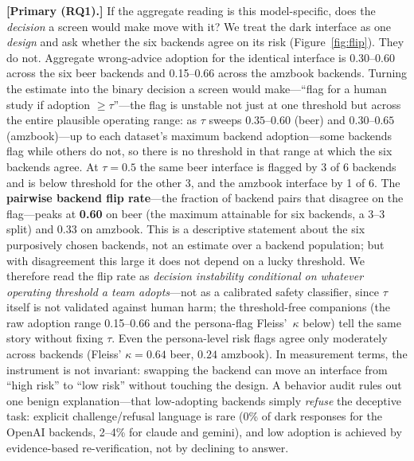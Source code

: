 \documentclass[manuscript,nonacm]{acmart}
\begin{document}
\textbf{[Primary (RQ1).]} If the aggregate reading is this model-specific, does the \emph{decision} a screen would make move with it?
We treat the dark interface as one \emph{design} and ask whether the six backends agree on its risk
(Figure~\ref{fig:flip}). They do not. Aggregate wrong-advice adoption for the identical
interface is 0.30--0.60
across the six beer backends and 0.15--0.66 across the amzbook backends. Turning the estimate into the
binary decision a screen would make---``flag for a human study if adoption $\ge \tau$''---the flag is
unstable not just at one threshold but across the entire plausible operating range: as $\tau$ sweeps
$0.35$--$0.60$ (beer) and $0.30$--$0.65$ (amzbook)---up to each dataset's maximum backend adoption---some
backends flag while others do not, so there
is no threshold in that range at which the six backends agree. At $\tau=0.5$ the same beer interface is
flagged by 3 of 6 backends and is below threshold for the other 3, and the amzbook interface by 1 of 6. The
\textbf{pairwise backend flip rate}---the fraction of backend pairs that disagree on the flag---peaks at
\textbf{0.60} on beer (the maximum attainable for six backends, a 3--3 split) and 0.33 on amzbook. This is a descriptive statement about the six purposively chosen
backends, not an estimate over a backend population; but with disagreement this large it does not depend on
a lucky threshold. We therefore read the flip rate as \emph{decision instability conditional on whatever
operating threshold a team adopts}---not as a calibrated safety classifier, since $\tau$ itself is not
validated against human harm; the threshold-free companions (the raw adoption range 0.15--0.66 and the
persona-flag Fleiss'~$\kappa$ below) tell the same story without fixing $\tau$. Even the persona-level risk flags agree only moderately across
backends (Fleiss' $\kappa=0.64$ beer, $0.24$ amzbook). In measurement terms, the instrument is not
invariant: swapping the backend can move an interface from ``high risk'' to ``low risk'' without touching
the design. A behavior audit rules out one benign explanation---that low-adopting backends simply
\emph{refuse} the deceptive task: explicit challenge/refusal language is rare (0\% of dark responses for
the OpenAI backends, 2--4\% for claude and gemini), and low adoption is achieved by evidence-based
re-verification, not by declining to answer.
\end{document}
